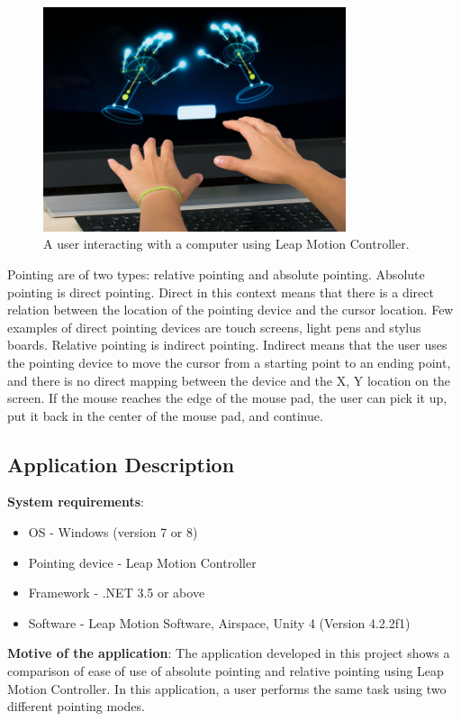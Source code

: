 \documentclass[titlepage]{article}
\begin{document}
\begin{figure}[!h]
\centering
\includegraphics[width=3.5in]{Figure_3}
\caption{A user interacting with a computer using Leap Motion Controller.}
\end{figure}

Pointing are of two types: relative pointing and absolute pointing. Absolute pointing \cite{1} is direct pointing. Direct in this context means that there is a direct relation between the location of the pointing device and the cursor location. Few examples of direct pointing devices are touch screens, light pens and stylus boards. Relative pointing \cite{1} is indirect pointing. Indirect means that the user uses the pointing device to move the cursor from a starting point to an ending point, and there is no direct mapping between the device and the X, Y location on the screen. If the mouse reaches the edge of the mouse pad, the user can pick it up, put it back in the center of the mouse pad, and continue.   

\subsection{Application Description}

{\bf System requirements}:
\begin{itemize}
\item OS - Windows (version 7 or 8)
\item Pointing device - Leap Motion Controller
\item Framework - .NET 3.5 or above
\item Software - Leap Motion Software, Airspace, Unity 4 (Version 4.2.2f1)
\end{itemize}

{\bf Motive of the application}: The application developed in this project shows a comparison of ease of use of absolute pointing and relative pointing using Leap Motion Controller. In this application, a user performs the same task using two different pointing modes. 
\end{document}
